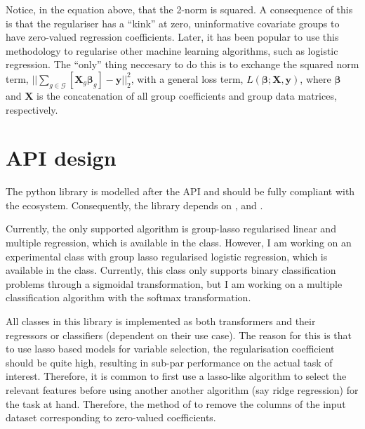 \documentclass[letterpaper,10pt,english]{sphinxmanual}
\begin{document}
Notice, in the equation above, that the 2-norm is  squared. A consequence
of this is that the regulariser has a “kink” at zero, uninformative covariate
groups to have zero-valued regression coefficients. Later, it has been popular
to use this methodology to regularise other machine learning algorithms, such
as logistic regression. The “only” thing neccesary to do this is to exchange
the squared norm term, \(|| \sum_{g \in \mathcal{G}} \left[\mathbf{X}_g\mathbf{\beta}_g\right] - \mathbf{y} ||_2^2\),
with a general loss term, \(L(\mathbf{\beta}; \mathbf{X}, \mathbf{y})\),
where \(\mathbf{\beta}\) and \(\mathbf{X}\) is the concatenation
of all group coefficients and group data matrices, respectively.


\chapter{API design}
\label{\detokenize{index:api-design}}
The  python library is modelled after the  API
and should be fully compliant with the  ecosystem.
Consequently, the  library depends on , 
and .

Currently, the only supported algorithm is group-lasso regularised linear
and multiple regression, which is available in the 
class. However, I am working on an experimental class with group lasso
regularised logistic regression, which is available in the
 class. Currently, this class only supports
binary classification problems through a sigmoidal transformation, but
I am working on a multiple classification algorithm with the softmax
transformation.

All classes in this library is implemented as both 
transformers and their regressors or classifiers (dependent on their
use case). The reason for this is that to use lasso based models for
variable selection, the regularisation coefficient should be quite high,
resulting in sub-par performance on the actual task of interest. Therefore,
it is common to first use a lasso-like algorithm to select the relevant
features before using another another algorithm (say ridge regression)
for the task at hand. Therefore, the  method of
 to remove the columns of the input dataset
corresponding to zero-valued coefficients.
\end{document}
